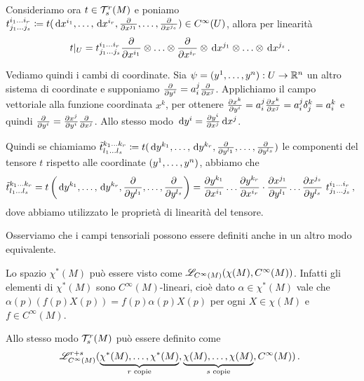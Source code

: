 
Consideriamo ora $t\in \Tau_s^r(M)$ e poniamo $t_{j_1\ldots j_s}^{i_1 \ldots i_r} \coloneqq t(\de x^{i_1}, \ldots, \de x^{i_r}, \DerParz{}{x^{j_1}}, \ldots, \DerParz{}{x^{j_s}}) \in C^\infty(U)$,
allora per linearità 
\begin{equation*}
	t\restrict U = t_{j_1\ldots j_s}^{i_1 \ldots i_r} \DerParz{}{x^{i_1}} \otimes \ldots \otimes \DerParz{}{x^{i_r}} \otimes \de x^{j_1}\otimes \ldots \otimes \de x^{j_s}\punto
\end{equation*}

Vediamo quindi i cambi di coordinate.
Sia $\psi=(y^1,\ldots, y^n): U \to \R^n$ un altro sistema di coordinate e supponiamo $\DerParz{}{y^i} = a_i^j \DerParz{}{x^j}$. Applichiamo il campo vettoriale alla funzione coordinata $x^k$, per ottenere $\DerParz{x^k}{y^i} = a_i^j \DerParz{x^k}{x^j} = a_i^j \delta_j^k = a_i^k$ e quindi $\DerParz{}{y^i} = \DerParz{x^j}{y^i} \DerParz{}{x^j}$.
Allo stesso modo $\de y^i = \DerParz{y^i}{x^j} \de x^j$.

Quindi se chiamiamo $\tilde t_{l_1\ldots l_s}^{k_1\ldots k_r} \coloneqq t(\de y^{k_1},\ldots,\de y^{k_r}, \DerParz{}{y^{l_1}},\ldots, \DerParz{}{y^{l_s}})$ le componenti del tensore $t$ rispetto alle coordinate $(\seqa yn,)$, abbiamo che
\begin{equation*}
	\tilde t_{l_1\ldots l_s}^{k_1\ldots k_r} = t\left(\de y^{k_1},\ldots,\de y^{k_r}, \DerParz{}{y^{l_1}},\ldots, \DerParz{}{y^{l_s}}\right) = \DerParz{y^{k_1}}{x^{i_1}}\ldots\DerParz{y^{k_r}}{x^{i_r}}\cdot \DerParz{x^{j_1}}{y^{l_1}}\ldots\DerParz{x^{j_s}}{y^{l_s}}\ t_{j_1\ldots j_s}^{i_1\ldots i_r} \virgola
\end{equation*}
dove abbiamo utilizzato le proprietà di linearità del tensore.



\begin{remark}
Osserviamo che i campi tensoriali possono essere definiti anche in un altro modo equivalente.

Lo spazio $\chi^*(M)$ può essere visto come $\Lin_{C^\infty(M)} (\chi(M), C^\infty(M))$. Infatti gli elementi di $\chi^*(M)$ sono $C^\infty(M)$-lineari, cioè dato $\alpha\in\chi^*(M)$ vale che $\alpha(p)(f(p)X(p)) = f(p) \alpha(p) X(p)$ per ogni $X\in\chi(M)$ e $f\in C^\infty(M)$. %

Allo stesso modo $\Tau_s^r(M)$ può essere definito come
\begin{equation*}
	\Lin_{C^\infty(M)}^{r+s}(\underbrace{\chi^*(M),\ldots,\chi^*(M)}_{\text{$r$ copie}},\underbrace{\chi(M),\ldots,\chi(M)}_{\text{$s$ copie}},C^\infty(M))\punto
\end{equation*}
\end{remark}


